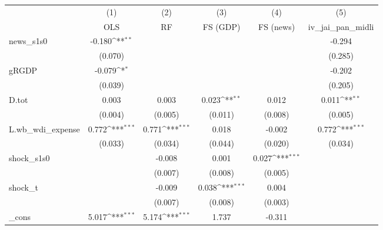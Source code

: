 {
\def\sym#1{\ifmmode^{#1}\else\(^{#1}\)\fi}
\begin{tabular}{l*{5}{c}}
\toprule
            &\multicolumn{1}{c}{(1)}&\multicolumn{1}{c}{(2)}&\multicolumn{1}{c}{(3)}&\multicolumn{1}{c}{(4)}&\multicolumn{1}{c}{(5)}\\
            &\multicolumn{1}{c}{OLS}&\multicolumn{1}{c}{RF}&\multicolumn{1}{c}{FS (GDP)}&\multicolumn{1}{c}{FS (news)}&\multicolumn{1}{c}{iv\_jai\_pan\_midli}\\
\midrule
news\_s1s0   &      -0.180\sym{**} &                     &                     &                     &      -0.294         \\
            &     (0.070)         &                     &                     &                     &     (0.285)         \\
\addlinespace
gRGDP       &      -0.079\sym{*}  &                     &                     &                     &      -0.202         \\
            &     (0.039)         &                     &                     &                     &     (0.205)         \\
\addlinespace
D.tot       &       0.003         &       0.003         &       0.023\sym{**} &       0.012         &       0.011\sym{**} \\
            &     (0.004)         &     (0.005)         &     (0.011)         &     (0.008)         &     (0.005)         \\
\addlinespace
L.wb\_wdi\_expense&       0.772\sym{***}&       0.771\sym{***}&       0.018         &      -0.002         &       0.772\sym{***}\\
            &     (0.033)         &     (0.034)         &     (0.044)         &     (0.020)         &     (0.034)         \\
\addlinespace
shock\_s1s0  &                     &      -0.008         &       0.001         &       0.027\sym{***}&                     \\
            &                     &     (0.007)         &     (0.008)         &     (0.005)         &                     \\
\addlinespace
shock\_t     &                     &      -0.009         &       0.038\sym{***}&       0.004         &                     \\
            &                     &     (0.007)         &     (0.008)         &     (0.003)         &                     \\
\addlinespace
\_cons      &       5.017\sym{***}&       5.174\sym{***}&       1.737         &      -0.311         &                     \\

\end{tabular}}
